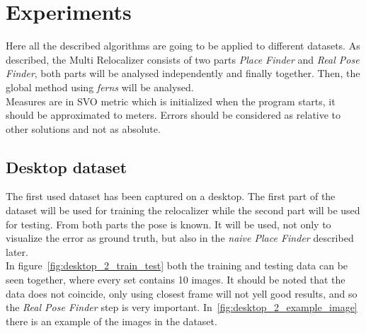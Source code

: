 \chapter{Experiments}\label{sec:experiments}

Here all the described algorithms are going to be applied to different datasets. As described, the Multi Relocalizer consists of two parts \textit{Place Finder} and \textit{Real Pose Finder}, both parts will be analysed independently and finally together. Then, the global method using \textit{ferns} will be analysed.\\

Measures are in SVO metric which is initialized when the program starts, it should be approximated to meters. Errors should be considered as relative to other solutions and not as absolute.\\

\section{Desktop dataset}

The first used dataset has been captured on a desktop. The first part of the dataset will be used for training the relocalizer while the second part will be used for testing. From both parts the pose is known. It will be used, not only to visualize the error as ground truth, but also in the \textit{naive Place Finder} described later.\\

In figure~\ref{fig:desktop_2_train_test} both the training and testing data can be seen together, where every set contains 10 images. It should be noted that the data does not coincide, only using closest frame will not yell good results, and so the \textit{Real Pose Finder} step is very important. In~\ref{fig:desktop_2_example_image} there is an example of the images in the dataset.\\

